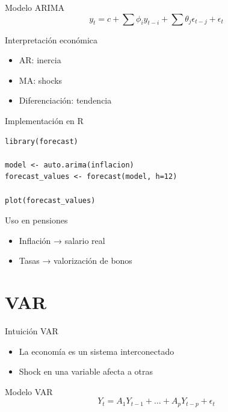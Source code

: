 \documentclass{beamer}
\begin{document}
\begin{frame}{Modelo ARIMA}
\[
y_t = c + \sum \phi_i y_{t-i} + \sum \theta_j \epsilon_{t-j} + \epsilon_t
\]
\end{frame}

\begin{frame}{Interpretación económica}
\begin{itemize}
\item AR: inercia
\item MA: shocks
\item Diferenciación: tendencia
\end{itemize}
\end{frame}

\begin{frame}[fragile]{Implementación en R}
\begin{verbatim}
library(forecast)

model <- auto.arima(inflacion)
forecast_values <- forecast(model, h=12)

plot(forecast_values)
\end{verbatim}
\end{frame}

\begin{frame}{Uso en pensiones}
\begin{itemize}
\item Inflación → salario real
\item Tasas → valorización de bonos
\end{itemize}
\end{frame}

\section{VAR}

\begin{frame}{Intuición VAR}
\begin{itemize}
\item La economía es un sistema interconectado
\item Shock en una variable afecta a otras
\end{itemize}
\end{frame}

\begin{frame}{Modelo VAR}
\[
Y_t = A_1 Y_{t-1} + \dots + A_p Y_{t-p} + \epsilon_t
\]
\end{frame}
\end{document}
